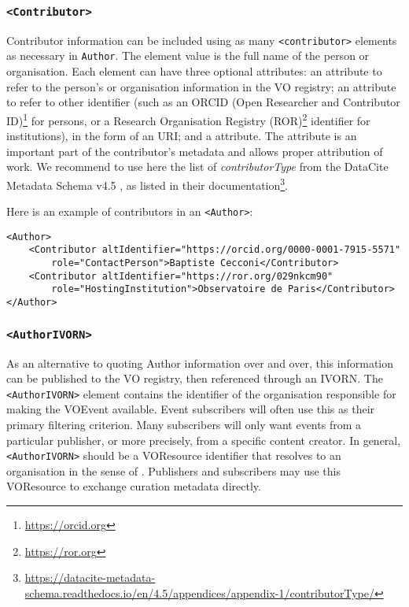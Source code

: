 \documentclass[11pt,a4paper]{ivoa}
\begin{document}
\subsubsection{\texttt{<Contributor>}}
Contributor information can be included using as many \verb|<contributor>|
elements as necessary in \verb|Author|. The element value is the full name of the person or
organisation. Each element can have three optional attributes: an 
attribute to refer to the person's or organisation information in the VO
registry; an  attribute to refer to other identifier (such
as an ORCID (Open Researcher and Contributor ID)\footnote{\url{https://orcid.org}}
for persons, or a Research Organisation Registry
(ROR)\footnote{\url{https://ror.org}} identifier for institutions), in the form
of an URI; and a  attribute. The  attribute is an important
part of the contributor's metadata and allows proper attribution of work. We
recommend to use here the list of \emph{contributorType} from the DataCite
Metadata Schema v4.5 \citep{https://doi.org/10.14454/g8e5-6293}, as listed in
their documentation\footnote{\url{https://datacite-metadata-schema.readthedocs.io/en/4.5/appendices/appendix-1/contributorType/}}.

Here is an example of contributors in an \verb|<Author>|:
\begin{lstlisting}
<Author>
	<Contributor altIdentifier="https://orcid.org/0000-0001-7915-5571"
	    role="ContactPerson">Baptiste Cecconi</Contributor>
	<Contributor altIdentifier="https://ror.org/029nkcm90"
	    role="HostingInstitution">Observatoire de Paris</Contributor>
</Author>
\end{lstlisting}

\subsubsection{\texttt{<AuthorIVORN>}}
As an alternative to quoting Author information over and over, this information
can be published to the VO registry, then referenced through an IVORN.
The \verb|<AuthorIVORN>| element contains the identifier of the organisation responsible
for making the VOEvent available. Event subscribers will often use this as their
primary filtering criterion. Many subscribers will only want events from a
particular publisher, or more precisely, from a specific content creator. In
general, \verb|<AuthorIVORN>| should be a VOResource identifier that resolves to
an organisation in the sense of \citep{2007ivoa.spec.0302H}. Publishers and
subscribers may use this VOResource to exchange curation metadata directly.
\end{document}
